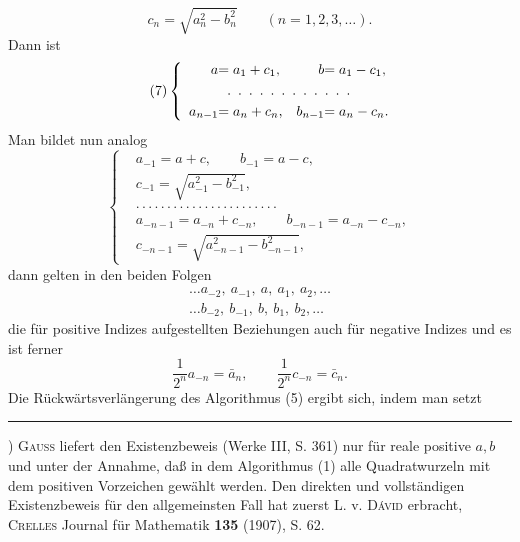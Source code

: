\begin{equation*}\tag*{(4a)}c_n=\sqrt{a_n^2-b_n^2}\qquad(n=1,2,3,\ldots).\end{equation*}
\noindent Dann ist
\begin{equation*}\tag*{(7)}
\left\{\begin{array}{r@{}l@{\quad}r@{}l}
a&=a_1+c_1,&b&=a_1-c_1,\\[3pt]
\multicolumn{4}{c}{.\enspace.\enspace.\enspace.\enspace.\enspace.\enspace.\enspace.\enspace.\enspace.\enspace.\enspace.}\\[3pt]
a_{n-1}&=a_n+c_n,&b_{n-1}&=a_n-c_n.
\end{array}\right.
\end{equation*}
\noindent Man bildet nun analog
\begin{equation*}\tag*{$(1')$}
\left\{\begin{aligned}
&a_{-1}=a+c,\qquad b_{-1}=a-c,\\
&c_{-1}=\sqrt{a_{-1}^2-b_{-1}^2},\\[3pt]
&.\,.\,.\,.\,.\,.\,.\,.\,.\,.\,.\,.\,.\,.\,.\,.\,.\,.\,.\,.\,.\,.\,.\\[3pt]
&a_{-n-1}=a_{-n}+c_{-n},\qquad b_{-n-1}=a_{-n}-c_{-n},\\
&c_{-n-1}=\sqrt{a_{-n-1}^2-b_{-n-1}^2},
\end{aligned}\right.
\end{equation*}
\noindent dann gelten in den beiden Folgen
\[
\begin{gathered}
\ldots a_{-2},\ a_{-1},\ a,\ a_1,\ a_2,\ldots\\
\ldots b_{-2},\ b_{-1},\ b,\ b_1,\ b_2,\ldots
\end{gathered}
\]
\noindent die für positive Indizes aufgestellten Beziehungen auch für negative Indizes und es ist ferner
\begin{equation*}\tag*{(8)}\frac{1}{2^n}a_{-n}=\bar a_n,\qquad\frac{1}{2^n}c_{-n}=\bar c_n.\end{equation*}
\noindent Die Rückwärtsverlängerung des Algorithmus (5) ergibt sich, indem man setzt
\par\smallskip\noindent\rule{.25\linewidth}{.4pt}\par
{\small\par\indent *) \textsc{Gauss} liefert den Existenzbeweis (Werke III, S. 361) nur für reale positive $a,b$ und unter der Annahme, daß in dem Algorithmus (1) alle Quadratwurzeln mit dem positiven Vorzeichen gewählt werden. Den direkten und vollständigen Existenzbeweis für den allgemeinsten Fall hat zuerst L. v. \textsc{Dávid} erbracht, \textsc{Crelles} Journal für Mathematik \textbf{135} (1907), S. 62.\par}
